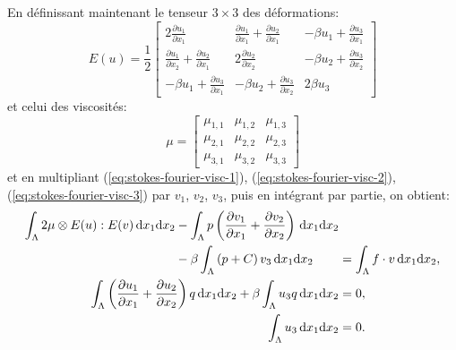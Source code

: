 En définissant maintenant le tenseur $3\times 3$ des déformations:
\begin{equation}\label{eq:stokes-fourier-strain-tensor-3d}
  E(u) = \frac{1}{2} \begin{bmatrix}
    2\displaystyle\frac{\partial u_1}{\partial x_1} %
    &  \displaystyle\frac{\partial u_1}{\partial x_1} + \displaystyle\frac{\partial u_2}{\partial x_1} %
    & - \beta u_1 + \displaystyle\frac{\partial u_3}{\partial x_1}\\
    \displaystyle\frac{\partial u_1}{\partial x_2}+ \displaystyle\frac{\partial u_2}{\partial x_1} %
    & 2 \displaystyle\frac{\partial u_2}{\partial x_2} %
    & -\beta u_2 + \displaystyle\frac{\partial u_3}{\partial x_2} \\
    - \beta u_1 + \displaystyle\frac{\partial u_3}{\partial x_1} %
    & - \beta u_2 + \displaystyle\frac{\partial u_3}{\partial x_2} & 2\beta u_3
  \end{bmatrix}
\end{equation}
et celui des viscosités:
\begin{equation}\label{eq:stokes-fourier-visc-tensor-3d}
\mu = \begin{bmatrix}
  \mu_{1,1} & \mu_{1,2} & \mu_{1,3} \\
  \mu_{2,1} & \mu_{2,2} & \mu_{2,3} \\
  \mu_{3,1} & \mu_{3,2} & \mu_{3,3}
\end{bmatrix}
\end{equation}
et en multipliant (\ref{eq:stokes-fourier-visc-1}),
(\ref{eq:stokes-fourier-visc-2}), (\ref{eq:stokes-fourier-visc-3}) par
$v_1$, $v_2$, $v_3$, puis en intégrant par partie, on obtient:
\begin{align}
  \begin{aligned}[b]
    \int_\Lambda 2\mu\otimes E(u):E(v)\,\mathrm dx_1\mathrm dx_2 %
    &- \int_\Lambda p\parent{\frac{\partial v_1}{\partial x_1}
                            + \frac{\partial v_2}{\partial x_2}}\,\mathrm dx_1\mathrm dx_2 \\
    &- \beta \int_\Lambda \parent{p + C}v_3\,\mathrm dx_1\mathrm dx_2
  \end{aligned}
  &= \int_\Lambda f\cdot v\,\mathrm dx_1\mathrm dx_2,\label{eq:stokes-fourier-visc-weak-1}\\
  \int_\Lambda \parent{\frac{\partial u_1}{\partial x_1} %
    + \frac{\partial u_2}{\partial x_2}}q\,\mathrm dx_1\mathrm dx_2 %
  + \beta \int_\Lambda u_3 q \,\mathrm dx_1\mathrm dx_2 %
  &= 0,\label{eq:stokes-fourier-visc-weak-2}\\
  \int_\Lambda u_3 \,\mathrm dx_1\mathrm dx_2 %
  &= 0.\label{eq:stokes-fourier-visc-weak-3}
\end{align}

